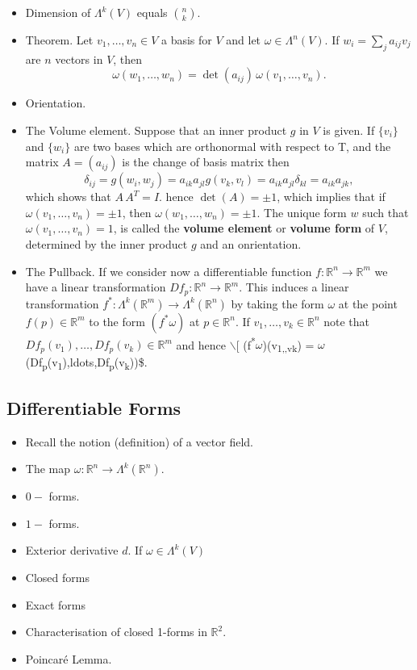\documentclass{amsart}
\begin{document}
\begin{itemize}
\begin{itemize}
\end{itemize}
\item Dimension of \(\Lambda^k(V)\) equals \({n\choose k}\).
\item Theorem. Let \(v_1,\ldots, v_n\in V\) a basis for \(V\) and let \(\omega \in \Lambda^n(V)\). If \(w_i = \sum_{j}a_{ij}v_j\) are \(n\) vectors in \(V\), then \[ \omega(w_1, \ldots, w_n) = \det(a_{ij}) \, \omega(v_1,\ldots,v_n).\]
\item Orientation.
\item The Volume element. Suppose that an inner product \(g\) in \(V\) is given. If \(\{v_i\}\) and \(\{w_i\}\) are two bases which are orthonormal with respect to T, and the matrix \(A = (a_{ij})\) is the change of basis matrix then \[ \delta_{ij} = g(w_i,w_j) = a_{ik}a_{jl}g(v_k,v_l) = a_{ik}a_{jl}\delta_{kl} = a_{ik}a_{jk}, \] which shows that \(A\,A^T = I\). hence \(\det(A) = \pm 1\), which implies that if \(\omega(v_1,\ldots,v_n) = \pm 1\), then \(\omega(w_1,\ldots,w_n) = \pm 1\). The unique form \(w\) such that \(\omega(v_1,\ldots,v_n) = 1\), is called the \textbf{volume element} or \textbf{volume form} of \(V\), determined by the inner product \(g\) and an onrientation.
\item The Pullback. If we consider now a differentiable function \(f: \mathbb{R}^n\to\mathbb{R}^m\) we have a linear transformation \(Df_p: \mathbb{R}^n \to \mathbb{R}^m\). This induces a linear transformation \(f^*:\Lambda^k(\mathbb{R}^m) \to \Lambda^k(\mathbb{R}^{n})\) by taking the form \(\omega\) at the point \(f(p)\in \mathbb{R}^m\) to  the form \((f^*\omega)\) at \(p\in\mathbb{R}^n\). If \(v_1, \ldots, v_k \in \mathbb{R}^n\) note that \(Df_p(v_1), \ldots, Df_p(v_k) \in \mathbb{R}^m\) and hence $\backslash$[ (f\textsuperscript{*}\(\omega\))(v\textsubscript{1,\ldtos,v}\textsubscript{k}) = \(\omega\)(Df\textsubscript{p}(v\textsubscript{1}),ldots,Df\textsubscript{p}(v\textsubscript{k}))\$.
\end{itemize}

\subsection{Differentiable Forms}
\label{sec:org1301abf}
\begin{itemize}
\item Recall the notion (definition) of a vector field.
\item The map \(\omega : \mathbb{R}^n \to \Lambda^k(\mathbb{R}^n)\).
\item \(0-\) forms.
\item \(1-\) forms.
\item Exterior derivative \(d\). If \(\omega \in \Lambda^{k}(V)\)
\item Closed forms
\item Exact forms
\item Characterisation of closed 1-forms in \(\mathbb{R}^2\).
\item Poincaré Lemma.
\end{itemize}
\end{document}
